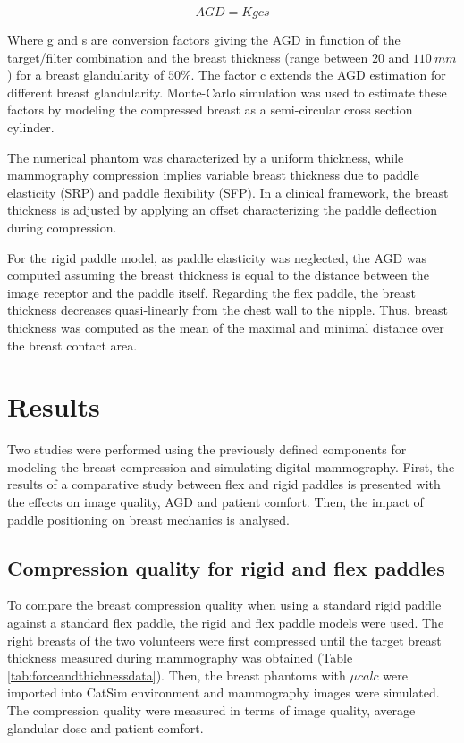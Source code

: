 \begin{equation}
AGD = K g c s
\end{equation}

Where g and s are conversion factors giving the AGD in function of the target/filter combination and the breast thickness (range between $20$ and $110\ mm$) for a breast glandularity of $50\%$. The factor c extends the AGD estimation for different breast glandularity. Monte-Carlo simulation was used to estimate these factors by modeling the compressed breast as a semi-circular cross section cylinder. 

The numerical phantom was characterized by a uniform thickness, while mammography compression implies variable breast thickness due to paddle elasticity (SRP) and paddle flexibility (SFP). In a clinical framework, the breast thickness is adjusted by applying an offset characterizing the paddle deflection during compression.      

For the rigid paddle model, as paddle elasticity was neglected, the AGD was computed assuming the breast thickness is equal to the distance between the image receptor and the paddle itself. Regarding the flex paddle, the breast thickness decreases quasi-linearly from the chest wall to the nipple. Thus, breast thickness was computed as the mean of the maximal and minimal distance over the breast contact area.

\section{Results}\label{section:breastcompressionevaluation}
Two studies were performed using the previously defined components for modeling the breast compression and simulating digital mammography. First, the results of a comparative study between flex and rigid paddles is presented with the effects on image quality, AGD and patient comfort. Then, the impact of paddle positioning on breast mechanics is analysed.   
\subsection{Compression quality for rigid and flex paddles}

To compare the breast compression quality when using a standard rigid paddle against a standard flex paddle, the rigid and flex paddle models were used. The right breasts of the two volunteers were first compressed until the target breast thickness measured during mammography was obtained (Table \ref{tab:forceandthichnessdata}). Then, the breast phantoms with $\mu calc $ were imported into CatSim environment and mammography images were simulated. The compression quality were measured in terms of image quality, average glandular dose and patient comfort.

